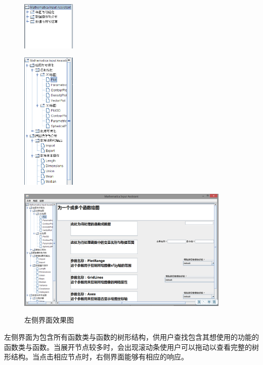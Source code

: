 \documentclass[hyperref, UTF8
,bookmarksnumbered=true, oneside]{ctexbook}
\begin{document}
		\begin{figure}[!h]
			\begin{minipage}[b]{0.15\textwidth}
			\centering
			\includegraphics[width=1in]{Left1.png}
			\label{pic:MathPack}
			\end{minipage}%
			\hspace{0.025\textwidth}%
			\begin{minipage}[b]{0.15\textwidth}
			\centering
			\includegraphics[width=1in]{Left2.png}
			\label{pic:GUIPack}
			\end{minipage}			
			\hspace{0.025\textwidth}%
			\begin{minipage}[b]{0.6\textwidth}
			\centering
			\includegraphics[width=4in]{Left3.png}
			\label{pic:GUIPack}
			\end{minipage}
			\caption{左侧界面效果图}
		\end{figure}

		左侧界面为包含所有函数类与函数的树形结构，供用户查找包含其想使用的功能的函数类与函数。当展开节点较多时，会出现滚动条使用户可以拖动以查看完整的树形结构。当点击相应节点时，右侧界面能够有相应的响应。
		
\end{document}
